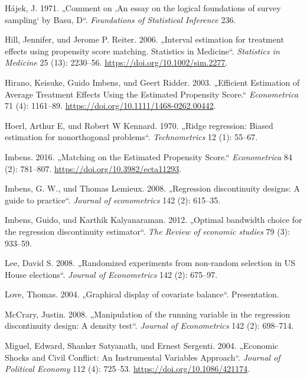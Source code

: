 \documentclass[
  a4paper,
  DIV=11,
  oneside]{scrreprt}
\newlength{\cslhangindent}
\newenvironment{CSLReferences}[2] %
 {\begin{list}{}{%
  \setlength{\itemindent}{0pt}
  \setlength{\leftmargin}{0pt}
  \setlength{\parsep}{0pt}
  \ifodd #1
   \setlength{\leftmargin}{\cslhangindent}
   \setlength{\itemindent}{-1\cslhangindent}
  \fi
  \setlength{\itemsep}{#2\baselineskip}}}
 {\end{list}}
\begin{document}
\begin{CSLReferences}{1}{0}
Hájek, J. 1971. {„Comment on {‚An essay on the logical foundations of
survey sampling`} by Basu, D``}. \emph{Foundations of Statistical
Inference} 236.

Hill, Jennifer, und Jerome P. Reiter. 2006. {„Interval estimation for
treatment effects using propensity score matching. Statistics in
Medicine``}. \emph{Statistics in Medicine} 25 (13): 2230--56.
\url{https://doi.org/10.1002/sim.2277}.

Hirano, Keisuke, Guido Imbens, und Geert Ridder. 2003. {„Efficient
Estimation of Average Treatment Effects Using the Estimated Propensity
Score.``} \emph{Econometrica} 71 (4): 1161--89.
\url{https://doi.org/10.1111/1468-0262.00442}.

Hoerl, Arthur E, und Robert W Kennard. 1970. {„{Ridge regression: Biased
estimation for nonorthogonal problems}``}. \emph{Technometrics} 12 (1):
55--67.

Imbens. 2016. {„Matching on the Estimated Propensity Score.``}
\emph{Econometrica} 84 (2): 781--807.
\url{https://doi.org/10.3982/ecta11293}.

Imbens, G. W., und Thomas Lemieux. 2008. {„Regression discontinuity
designs: A guide to practice``}. \emph{Journal of econometrics} 142 (2):
615--35.

Imbens, Guido, und Karthik Kalyanaraman. 2012. {„Optimal bandwidth
choice for the regression discontinuity estimator``}. \emph{The Review
of economic studies} 79 (3): 933--59.

Lee, David S. 2008. {„Randomized experiments from non-random selection
in US House elections``}. \emph{Journal of Econometrics} 142 (2):
675--97.

Love, Thomas. 2004. {„Graphical display of covariate balance``}.
Presentation.

McCrary, Justin. 2008. {„Manipulation of the running variable in the
regression discontinuity design: A density test``}. \emph{Journal of
Econometrics} 142 (2): 698--714.

Miguel, Edward, Shanker Satyanath, und Ernest Sergenti. 2004. {„Economic
Shocks and Civil Conflict: An Instrumental Variables Approach``}.
\emph{Journal of Political Economy} 112 (4): 725--53.
\url{https://doi.org/10.1086/421174}.


\end{CSLReferences}
\end{document}
